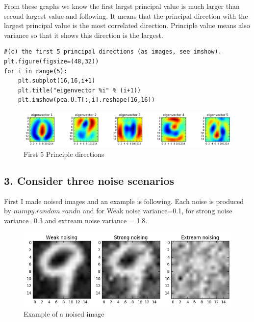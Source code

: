 \documentclass[a4paper,11pt]{article}
\begin{document}
\begin{verbatim}

\end{verbatim}

From these graphs we know the first largst principal value is much larger than second largest value and following. It means that the principal direction with the largest principal value is the most correlated direction. Principle value means also variance so that it shows this direction is the largest.  \\ 

\begin{verbatim}
#(c) the first 5 principal directions (as images, see imshow).
plt.figure(figsize=(48,32))
for i in range(5):
    plt.subplot(16,16,i+1)
    plt.title("eigenvector %i" % (i+1))
    plt.imshow(pca.U.T[:,i].reshape(16,16))
\end{verbatim}


\begin{figure}[htbp]
  \includegraphics[scale=0.4]{5eigv.png}
  \caption{First 5 Principle directions}
\end{figure}

\subsection*{3. Consider three noise scenarios}
First I made noised images and an example is following. Each noise is produced by $numpy.random.randn$ and for Weak noise variance=0.1, for strong noise variance=0.3 and extream noise variance = 1.8.
\begin{figure}[htbp]
  \includegraphics[scale=0.4]{noisimg.png}
  \caption{Example of a noised image}
\end{figure}
\end{document}
